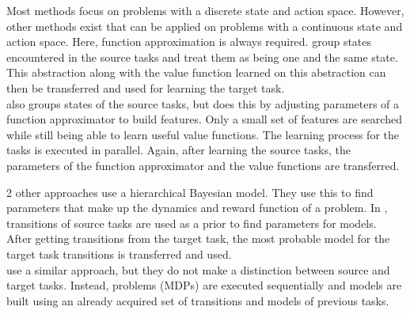 Most methods focus on problems with a discrete state and action space. However, other methods exist that can be applied on problems with a continuous state and action space.
Here, function approximation is always required. \cite{walsh2006transferring} group states encountered in the source tasks and treat them as being one and the same state.
This abstraction along with the value function learned on this abstraction can then be transferred and used for learning the target task.\\
\cite{lazaric2008knowledge} also groups states of the source tasks, but does this by adjusting parameters of a function approximator to build features.
Only a small set of features are searched while still being able to learn useful value functions. The learning process for the tasks is executed in parallel.
Again, after learning the source tasks, the parameters of the function approximator and the value functions are transferred.

2 other approaches use a hierarchical Bayesian model. They use this to find parameters that make up the dynamics and reward function of a problem. In \cite{sunmola2006model}, transitions of source tasks are used as a prior to find parameters for models.
After getting transitions from the target task, the most probable model for the target task transitions is transferred and used.\\
\cite{conf/icml/WilsonFRT07} use a similar approach, but they do not make a distinction between source and target tasks. Instead, problems (MDPs) are executed sequentially and models are built using an already acquired set of transitions and models of previous tasks.\\

